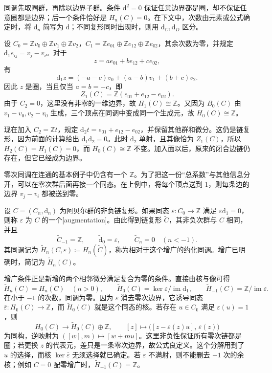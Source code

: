 同调先取圈群，再除以边界子群。条件 \(\mathrm{d}^2=0\) 保证任意边界都是圈，却不保证任意圈都是边界；后一个条件恰好是 \(H_n(C)=0\)。在下文中，次数由元素或公式确定时，将 \(\mathrm{d}_n\) 简写为 \(\mathrm{d}\)；不同复形同时出现时，则用 \(\mathrm{d}_C,\mathrm{d}_D\) 区分。

\begin{example}\label{g2:exm:triangle-chain-complex}
	设 \(C_0=\mathbb Zv_0\oplus\mathbb Zv_1\oplus\mathbb Zv_2\)，\(C_1=\mathbb Ze_{01}\oplus\mathbb Ze_{12}\oplus\mathbb Ze_{02}\)，其余次数为零，并规定 \(\mathrm{d}_1e_{ij}=v_j-v_i\)。对于
	\[
		z=ae_{01}+be_{12}+ce_{02},
	\]
	有
	\[
		\mathrm{d}_1z=(-a-c)v_0+(a-b)v_1+(b+c)v_2.
	\]
	因此 \(z\) 是圈，当且仅当 \(a=b=-c\)，即
	\[
		Z_1(C)=\mathbb Z(e_{01}+e_{12}-e_{02}).
	\]
	由于 \(C_2=0\)，这里没有非零的一维边界，故 \(H_1(C)\cong\mathbb Z\)。又因为 \(B_0(C)\) 由 \(v_1-v_0,v_2-v_0\) 生成，三个顶点在同调中变成同一个生成元，故 \(H_0(C)\cong\mathbb Z\)。

	现在加入 \(C_2=\mathbb Zt\)，规定 \(\mathrm{d}_2t=e_{01}+e_{12}-e_{02}\)，并保留其他群和微分。这仍是链复形，因为前面的计算给出 \(\mathrm{d}_1\mathrm{d}_2=0\)。此时 \(\mathrm{d}_2\) 单射，且其像恰为 \(Z_1(C)\)，所以 \(H_2(C)=H_1(C)=0\)，而 \(H_0(C)\cong\mathbb Z\) 不变。加入面以后，原来的闭合边链仍存在，但它已经成为边界。
\end{example}

零次同调在连通的基本例子中仍含有一个 \(\mathbb Z\)。为了把这一份“总系数”与其他信息分开，可以在零次群后面再接一个同态。在上例中，将每个顶点送到 \(1\)，则每条边的边界 \(v_j-v_i\) 都被送到零。

\begin{definition}\label{g2:def:augmented-chain-complex}
	设 \(C=(C_n,\mathrm{d}_n)\) 为阿贝尔群的非负链复形。如果同态 \(\varepsilon:C_0\to\mathbb Z\) 满足 \(\varepsilon\mathrm{d}_1=0\)，则称 \(\varepsilon\) 为 \(C\) 的一个[augmentation]。由此得到链复形 \(\widetilde C\)，其非负次群与 \(C\) 相同，并且
	\[
		\widetilde C_{-1}=\mathbb Z,\qquad
		\widetilde{\mathrm{d}}_0=\varepsilon,\qquad
		\widetilde C_n=0\quad(n<-1).
	\]
	其同调记为 \(\widetilde H_n(C,\varepsilon)\coloneqq H_n(\widetilde C)\)，称为相对于这个增广的约化同调。增广已明确时，简记为 \(\widetilde H_n(C)\)。
\end{definition}

增广条件正是新增的两个相邻微分满足复合为零的条件。直接由核与像可得
\[
	\widetilde H_n(C)=H_n(C)\quad(n>0),\qquad
	\widetilde H_0(C)=\ker\varepsilon/\operatorname{im}\mathrm{d}_1,
	\qquad
	\widetilde H_{-1}(C)=\mathbb Z/\operatorname{im}\varepsilon.
\]
在小于 \(-1\) 的次数，同调为零。因为 \(\varepsilon\) 消去零次边界，它诱导同态 \(\bar\varepsilon:H_0(C)\to\mathbb Z\)，而 \(\widetilde H_0(C)\) 就是这个同态的核。若存在 \(u\in C_0\) 满足 \(\varepsilon(u)=1\)，则
\[
	H_0(C)\longrightarrow\widetilde H_0(C)\oplus\mathbb Z,\qquad
	[z]\longmapsto\bigl([z-\varepsilon(z)u],\,\varepsilon(z)\bigr)
\]
为同构，逆映射为 \(([w],m)\mapsto[w+mu]\)。这里非负性保证所有零次链都是圈；若更换 \(z\) 的代表元，差只是一条零次边界，故公式良定义。这个分解用到了 \(u\) 的选择，而核 \(\ker\bar\varepsilon\) 无须选择就已确定。若 \(\varepsilon\) 不满射，则不能删去 \(-1\) 次的余核；例如 \(C=0\) 配零增广时，\(\widetilde H_{-1}(C)=\mathbb Z\)。

